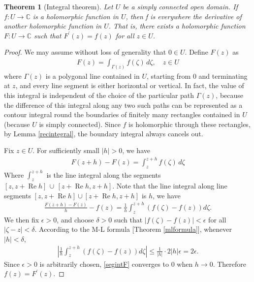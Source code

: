 \documentclass{article}
\numberwithin{equation}{section}
\newcommand{\bbC}{\mathbb{C}}
\DeclareMathOperator{\re}{Re}
\theoremstyle{plain}
\newtheorem{theorem}{Theorem}[section]
\theoremstyle{definition}
\begin{document}
\begin{theorem}[Integral theorem]\label{intthm}
Let $U$ be a simply connected open domain. If $f:U\to\bbC$ is a holomorphic function in $U$, then f is everywhere the derivative of another holomorphic function in $U$. That is,
there exists a holomorphic function $F:U\to\bbC$ such that $F^\prime(z) = f(z)$ for all $z\in U$.
\end{theorem}
\begin{proof}
We may assume without loss of generality that $0\in U$. Define $F(z)$ as
\begin{align*}
	F(z)=\int_{\Gamma(z)}f(\zeta)\,d\zeta,\quad z\in U
\end{align*}
where $\Gamma(z)$ is a polygonal line contained in $U$, starting from $0$ and terminating at $z$, and every line segment is either horizontal or vertical. In fact, the value of this integral is independent of the choice of the particular path $\Gamma(z)$, because the difference of this integral along any two such paths can be represented as a contour integral round the boundaries of finitely many rectangles contained in $U$ (because $U$ is simply connected). Since $f$ is holomorphic through these rectangles, by Lemma \ref{recintegral}, the boundary integral always cancels out.

Fix $z\in U$. For sufficiently small $\vert h\vert>0$, we have
\begin{align*}
	F(z+h)-F(z)=\int_z^{z+h} f(\zeta)\,d\zeta
\end{align*}
Where $\int_z^{z+h}$ is the line integral along the segments $[z,z+\re h]\,\cup\,[z+\re h,z+h]$. Note that the line integral along line segments $[z,z+\re h]\cup[z+\re h,z+h]$ is $h$, we have
\begin{align}
	\frac{F(z+h)-F(z)}{h}-f(z)=\frac{1}{h}\int_z^{z+h} \left(f(\zeta)-f(z)\right)d\zeta.\label{segintF}
\end{align}
We then fix $\epsilon>0$, and choose $\delta>0$ such that $\vert f(\zeta)-f(z)\vert<\epsilon$ for all $\vert\zeta-z\vert<\delta$. According to the M-L formula [Theorem \ref{mlformula}], whenever $\vert h\vert<\delta$,
\begin{align*}
	\left\vert\frac{1}{h}\int_z^{z+h} \left(f(\zeta)-f(z)\right)d\zeta\right\vert\leq\frac{1}{\vert h\vert}\cdot 2\vert h\vert\epsilon=2\epsilon.
\end{align*}
Since $\epsilon>0$ is arbitrarily chosen, \ref{segintF} converges to $0$ when $h\to 0$. Therefore $f(z)=F^\prime(z)$.
\end{proof}
\end{document}
